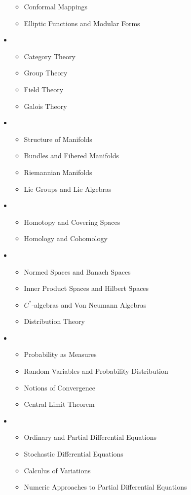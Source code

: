 \begin{itemize}
\begin{itemize}
        \item Conformal Mappings
        \item Elliptic Functions and Modular Forms
    \end{itemize}
    \item {}
    \begin{itemize}
        \item Category Theory
        \item Group Theory
        \item Field Theory
        \item Galois Theory
    \end{itemize}
    \item {}
    \begin{itemize}
        \item Structure of Manifolds
        \item Bundles and Fibered Manifolds
        \item Riemannian Manifolds
        \item Lie Groups and Lie Algebras
    \end{itemize}
    \item {}
    \begin{itemize}
        \item Homotopy and Covering Spaces
        \item Homology and Cohomology
    \end{itemize}
    \item {}
    \begin{itemize}
        \item Normed Spaces and Banach Spaces
        \item Inner Product Spaces and Hilbert Spaces
        \item \(C^\ast\)-algebras and Von Neumann Algebras
        \item Distribution Theory
    \end{itemize}
    \item {}
    \begin{itemize}
        \item Probability as Measures
        \item Random Variables and Probability Distribution
        \item Notions of Convergence
        \item Central Limit Theorem
    \end{itemize}
    \item {}
    \begin{itemize}
        \item Ordinary and Partial Differential Equations
        \item Stochastic Differential Equations
        \item Calculus of Variations
        \item Numeric Approaches to Partial Differential Equations
    \end{itemize}
\end{itemize}

